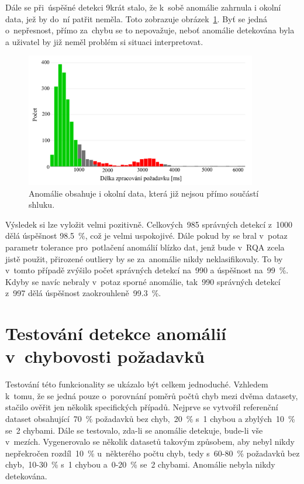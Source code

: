 Dále se při~úspěšné detekci 9krát stalo, že k~sobě anomálie zahrnula i okolní data, jež by do~ní patřit neměla. Toto zobrazuje obrázek~\ref{prilis-siroka-anomalie-img}. Byť se jedná o~nepřesnost, přímo za~chybu se to nepovažuje, neboť anomálie detekována byla a uživatel by již neměl problém si situaci interpretovat.

\begin{figure}[!hbt]
    \centering
    \includegraphics[width=0.9\textwidth]{obrazky/testovani-too-wide-anomaly.pdf}
    \caption{Anomálie obsahuje i okolní data, která již nejsou přímo součástí shluku.}
    \label{prilis-siroka-anomalie-img}
\end{figure}

Výsledek si lze vyložit velmi pozitivně. Celkových~985 správných detekcí z~1000 dělá úspěšnost 98.5~\%, což je velmi uspokojivé. Dále pokud by se bral v~potaz parametr tolerance pro~potlačení anomálií blízko dat, jenž bude v~RQA zcela jistě použit, přirozené outliery by se za~anomálie nikdy neklasifikovaly. To by v~tomto případě zvýšilo počet správných detekcí na~990 a úspěšnost na~99~\%. Kdyby se navíc nebraly v~potaz sporné anomálie, tak~990 správných detekcí z~997 dělá úspěšnost zaokrouhleně~99.3~\%.

\section{Testování detekce anomálií v~chybovosti požadavků}
Testování této funkcionality se ukázalo být celkem jednoduché. Vzhledem k~tomu, že se jedná pouze o~porovnání poměrů počtů chyb mezi dvěma datasety, stačilo ověřit jen několik specifických případů. Nejprve se vytvořil referenční dataset obsahující~70~\% požadavků bez chyb,~20~\% s~1 chybou a zbylých~10~\% se~2 chybami. Dále se testovalo, zda-li se anomálie detekuje, bude-li vše v~mezích. Vygenerovalo se několik datasetů takovým způsobem, aby nebyl nikdy nepřekročen rozdíl~10~\% u~některého počtu chyb, tedy s~60-80~\% požadavků bez chyb,~10-30~\% s~1 chybou a~0-20~\% se~2 chybami. Anomálie nebyla nikdy detekována.

